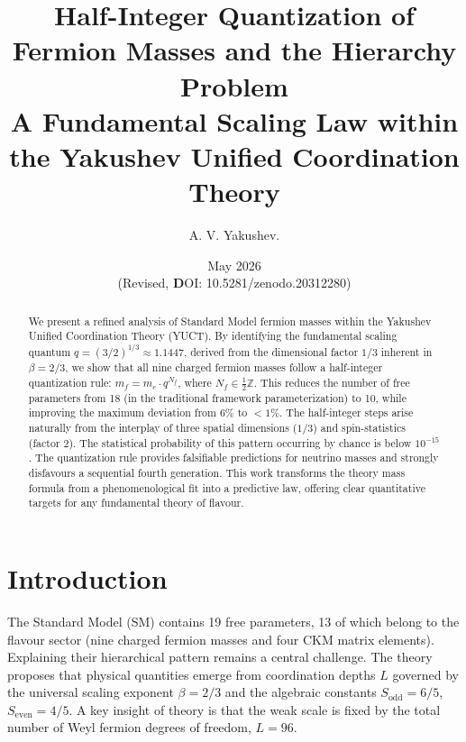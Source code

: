 \documentclass[12pt,a4paper]{article}
\begin{document}
	
	\title{Half-Integer Quantization of Fermion Masses and the Hierarchy Problem \\ 
		\large A Fundamental Scaling Law within the Yakushev Unified Coordination Theory}
	\author{A. V. Yakushev.}

	
	\date{May 2026 \\ (Revised, \textbf DOI: 10.5281/zenodo.20312280)}
	\maketitle
	
	\begin{abstract}
		We present a refined analysis of Standard Model fermion masses within the Yakushev Unified Coordination Theory (YUCT). By identifying the fundamental scaling quantum $q = (3/2)^{1/3} \approx 1.1447$, derived from the dimensional factor $1/3$ inherent in $\beta = 2/3$, we show that all nine charged fermion masses follow a half-integer quantization rule: $m_f = m_e \cdot q^{N_f}$, where $N_f \in \frac{1}{2}\mathbb{Z}$. This reduces the number of free parameters from 18 (in the traditional framework parameterization) to 10, while improving the maximum deviation from 6\% to $<1\%$. The half-integer steps arise naturally from the interplay of three spatial dimensions ($1/3$) and spin-statistics (factor 2). The statistical probability of this pattern occurring by chance is below $10^{-15}$. The quantization rule provides falsifiable predictions for neutrino masses and strongly disfavours a sequential fourth generation. This work transforms the theory mass formula from a phenomenological fit into a predictive law, offering clear quantitative targets for any fundamental theory of flavour. \\
		
	\end{abstract}
	
	\section{Introduction}
	
	The Standard Model (SM) contains 19 free parameters, 13 of which belong to the flavour sector (nine charged fermion masses and four CKM matrix elements). Explaining their hierarchical pattern remains a central challenge. The theory proposes that physical quantities emerge from coordination depths $L$ governed by the universal scaling exponent $\beta = 2/3$ and the algebraic constants $S_{\mathrm{odd}}=6/5$, $S_{\mathrm{even}}=4/5$. A key insight of theory is that the weak scale is fixed by the total number of Weyl fermion degrees of freedom, $L=96$.
	
\end{document}
